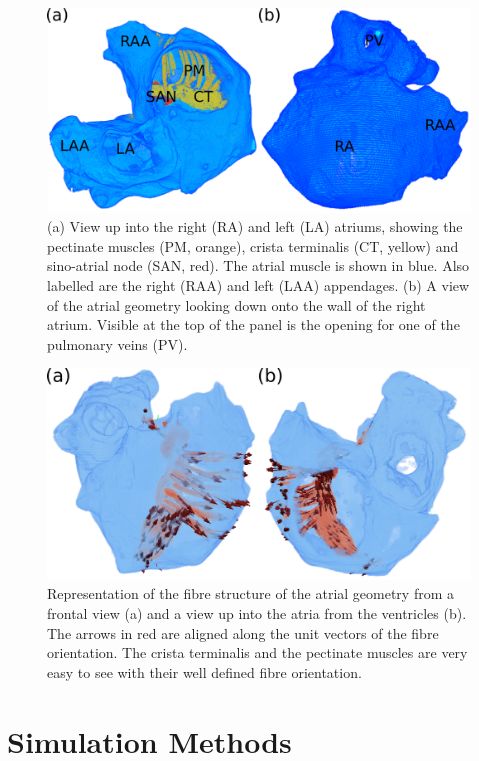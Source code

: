 \begin{figure}
\includegraphics{figures/atrium/structure/atrial_geometry}
\caption[Atrial Geometry]{
\label{atrium:geometry}
(a)
View up into the right (RA) and left (LA) atriums, showing the pectinate muscles
(PM, orange), crista terminalis (CT, yellow) and sino-atrial node (SAN, red).
The atrial muscle is shown in blue.
Also labelled are the right (RAA) and left (LAA) appendages.
(b)
A view of the atrial geometry looking down onto the wall of the right
atrium.  Visible at the top of the panel is the opening for one of the pulmonary
veins (PV).
}
\end{figure}

\begin{figure}
\includegraphics{figures/atrium/structure/fibres}
\caption[Atrial Fibre Structure]{
\label{atrium:fibres}
Representation of the fibre structure of the atrial geometry from a frontal
view (a) and a view up into the atria from the ventricles (b).
The arrows in red are aligned along the unit vectors of the fibre orientation.
The crista terminalis and the pectinate muscles are very easy to see with their
well defined fibre orientation.
}
\end{figure}

\section{Simulation Methods}
\label{atrium:sec:model}

